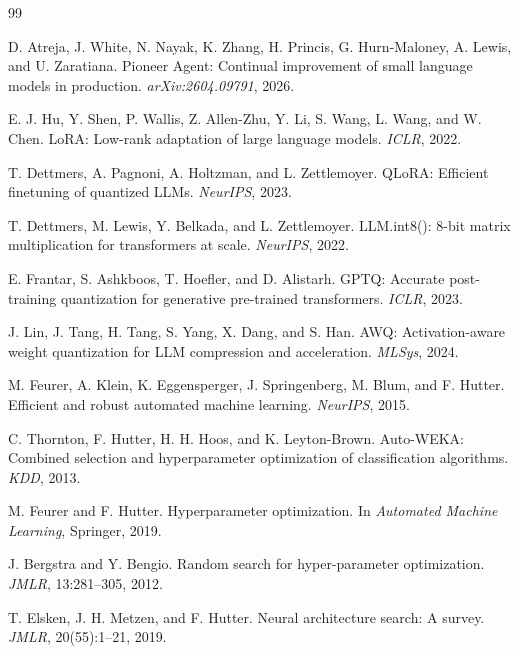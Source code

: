 \documentclass[sigconf,10pt]{acmart}
\newcommand{\TODO}[1]{\textcolor{red}{\textbf{[TODO: #1]}}}
\begin{document}
\begin{thebibliography}{99}
\small


D. Atreja, J. White, N. Nayak, K. Zhang, H. Princis, G. Hurn-Maloney, A. Lewis, and
U. Zaratiana. Pioneer Agent: Continual improvement of small language models in production.
\emph{arXiv:2604.09791}, 2026.

E. J. Hu, Y. Shen, P. Wallis, Z. Allen-Zhu, Y. Li, S. Wang, L. Wang, and W. Chen.
LoRA: Low-rank adaptation of large language models. \emph{ICLR}, 2022.

T. Dettmers, A. Pagnoni, A. Holtzman, and L. Zettlemoyer. QLoRA: Efficient finetuning of
quantized LLMs. \emph{NeurIPS}, 2023.

T. Dettmers, M. Lewis, Y. Belkada, and L. Zettlemoyer. LLM.int8(): 8-bit matrix
multiplication for transformers at scale. \emph{NeurIPS}, 2022.

E. Frantar, S. Ashkboos, T. Hoefler, and D. Alistarh. GPTQ: Accurate post-training
quantization for generative pre-trained transformers. \emph{ICLR}, 2023.

J. Lin, J. Tang, H. Tang, S. Yang, X. Dang, and S. Han. AWQ: Activation-aware weight
quantization for LLM compression and acceleration. \emph{MLSys}, 2024.

M. Feurer, A. Klein, K. Eggensperger, J. Springenberg, M. Blum, and F. Hutter. Efficient and
robust automated machine learning. \emph{NeurIPS}, 2015.

C. Thornton, F. Hutter, H. H. Hoos, and K. Leyton-Brown. Auto-WEKA: Combined selection and
hyperparameter optimization of classification algorithms. \emph{KDD}, 2013.

M. Feurer and F. Hutter. Hyperparameter optimization. In \emph{Automated Machine Learning},
Springer, 2019.

J. Bergstra and Y. Bengio. Random search for hyper-parameter optimization. \emph{JMLR},
13:281--305, 2012.

T. Elsken, J. H. Metzen, and F. Hutter. Neural architecture search: A survey. \emph{JMLR},
20(55):1--21, 2019.


\end{thebibliography}
\end{document}
